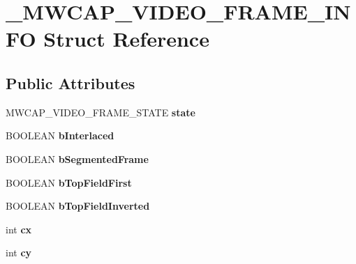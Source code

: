 \hypertarget{struct__MWCAP__VIDEO__FRAME__INFO}{\section{\-\_\-\-M\-W\-C\-A\-P\-\_\-\-V\-I\-D\-E\-O\-\_\-\-F\-R\-A\-M\-E\-\_\-\-I\-N\-F\-O Struct Reference}
\label{struct__MWCAP__VIDEO__FRAME__INFO}
}
\subsection*{Public Attributes}
\begin{DoxyCompactItemize}
\item 
\hypertarget{struct__MWCAP__VIDEO__FRAME__INFO_a73c54f62ecbfe1ba51bb070cab3bf3c3}{M\-W\-C\-A\-P\-\_\-\-V\-I\-D\-E\-O\-\_\-\-F\-R\-A\-M\-E\-\_\-\-S\-T\-A\-T\-E {\bfseries state}}\label{struct__MWCAP__VIDEO__FRAME__INFO_a73c54f62ecbfe1ba51bb070cab3bf3c3}

\item 
\hypertarget{struct__MWCAP__VIDEO__FRAME__INFO_a657399c891bb71788378bd92ddd2fce9}{B\-O\-O\-L\-E\-A\-N {\bfseries b\-Interlaced}}\label{struct__MWCAP__VIDEO__FRAME__INFO_a657399c891bb71788378bd92ddd2fce9}

\item 
\hypertarget{struct__MWCAP__VIDEO__FRAME__INFO_a9ae6c06bb7bad8775c1c0b084fd55d81}{B\-O\-O\-L\-E\-A\-N {\bfseries b\-Segmented\-Frame}}\label{struct__MWCAP__VIDEO__FRAME__INFO_a9ae6c06bb7bad8775c1c0b084fd55d81}

\item 
\hypertarget{struct__MWCAP__VIDEO__FRAME__INFO_a1d5b22e0a62aac53dc32fff07bab9f61}{B\-O\-O\-L\-E\-A\-N {\bfseries b\-Top\-Field\-First}}\label{struct__MWCAP__VIDEO__FRAME__INFO_a1d5b22e0a62aac53dc32fff07bab9f61}

\item 
\hypertarget{struct__MWCAP__VIDEO__FRAME__INFO_ae026ef491aa3c2fece1a99576cda1bc4}{B\-O\-O\-L\-E\-A\-N {\bfseries b\-Top\-Field\-Inverted}}\label{struct__MWCAP__VIDEO__FRAME__INFO_ae026ef491aa3c2fece1a99576cda1bc4}

\item 
\hypertarget{struct__MWCAP__VIDEO__FRAME__INFO_a5941dc9be6d24edab98fbc7ae88c358d}{int {\bfseries cx}}\label{struct__MWCAP__VIDEO__FRAME__INFO_a5941dc9be6d24edab98fbc7ae88c358d}

\item 
\hypertarget{struct__MWCAP__VIDEO__FRAME__INFO_a24d355b36ffb5661881831179a32a887}{int {\bfseries cy}}\label{struct__MWCAP__VIDEO__FRAME__INFO_a24d355b36ffb5661881831179a32a887}


\end{DoxyCompactItemize}
